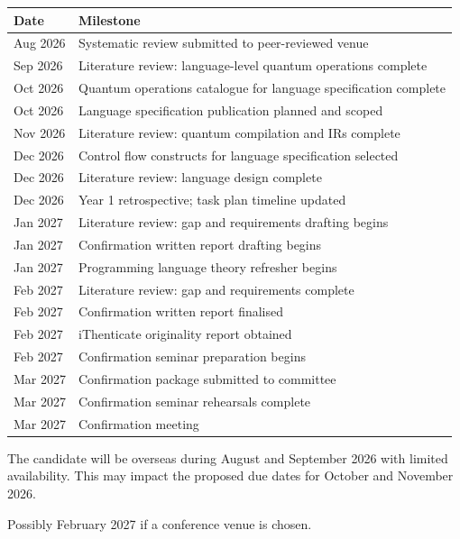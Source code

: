 \vspace{2em}
\begin{threeparttable}
    \begin{tabularx}{\textwidth}{@{}lX@{}}
        \toprule
        \textbf{Date\tnote{*}} & \textbf{Milestone} \\
        \midrule
        Aug 2026\tnote{\dag}          & Systematic review submitted to peer-reviewed venue \\
        Sep 2026           & Literature review: language-level quantum operations complete \\
        Oct 2026           & Quantum operations catalogue for language specification complete \\
        Oct 2026           & Language specification publication planned and scoped \\
        Nov 2026           & Literature review: quantum compilation and IRs complete \\
        Dec 2026           & Control flow constructs for language specification selected \\
        Dec 2026           & Literature review: language design complete \\
        Dec 2026           & Year 1 retrospective; task plan timeline updated \\
        Jan 2027           & Literature review: gap and requirements drafting begins \\
        Jan 2027           & Confirmation written report drafting begins \\
        Jan 2027           & Programming language theory refresher begins \\
        Feb 2027           & Literature review: gap and requirements complete \\
        Feb 2027           & Confirmation written report finalised \\
        Feb 2027           & iThenticate originality report obtained \\
        Feb 2027           & Confirmation seminar preparation begins \\
        Mar 2027           & Confirmation package submitted to committee \\
        Mar 2027           & Confirmation seminar rehearsals complete \\
        Mar 2027           & Confirmation meeting \\
        \bottomrule
    \end{tabularx}
    \begin{tablenotes}
        \footnotesize
        \item[*] The candidate will be overseas during August and September 2026 with limited availability. This may impact the proposed due dates for October and November 2026.
        \item[\dag] Possibly February 2027 if a conference venue is chosen.
    \end{tablenotes}
\end{threeparttable}
\vspace{2em}

